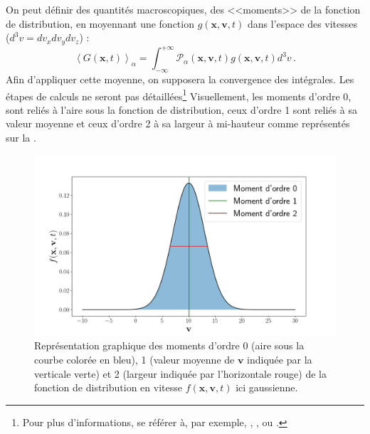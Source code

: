 On peut définir des quantités macroscopiques, des <<moments>> de la fonction de distribution, en moyennant une fonction $g\left(\mathbf{x},\mathbf{v},t\right)$ dans l'espace des vitesses ($d^3v=dv_xdv_ydv_z$) : 
\begin{equation}
 \left<G\left(\mathbf{x},t\right)\right>_{\alpha} = \int^{+\infty}_{-\infty} \mathcal{P}_{\alpha}\left(\mathbf{x},\mathbf{v},t\right) g\left(\mathbf{x},\mathbf{v},t\right) d^3v \, .
\end{equation}
Afin d'appliquer cette moyenne, on supposera la convergence des intégrales. Les étapes de calculs ne seront pas détaillées\footnote{Pour plus d'informations, se référer à, par exemple, \cite{krall_principles_1973},  \cite{rax_physique_2005}, \cite{galtier_introduction_2016} ou \cite{belmont_introduction_2018}.}
Visuellement, les moments d'ordre 0, sont reliés à l'aire sous la fonction de distribution, ceux d'ordre 1 sont reliés à sa valeur moyenne et ceux d'ordre 2 à sa largeur à mi-hauteur comme représentés sur la . 
\begin{figure}[!ht]
 \centering
\includegraphics[width=\linewidth,trim=2cm 0cm 3cm 1cm, clip=true]{./Part_0/images/distrib}
\cprotect\caption{Représentation graphique des moments d'ordre 0 (aire sous la courbe colorée en bleu), 1 (valeur moyenne de $\mathbf{v}$ indiquée par la verticale verte) et 2 (largeur indiquée par l'horizontale rouge) de la fonction de distribution en vitesse $f\left(\mathbf{x},\mathbf{v},t\right)$ ici gaussienne.}
\label{fig:distrib}
\end{figure}
 


